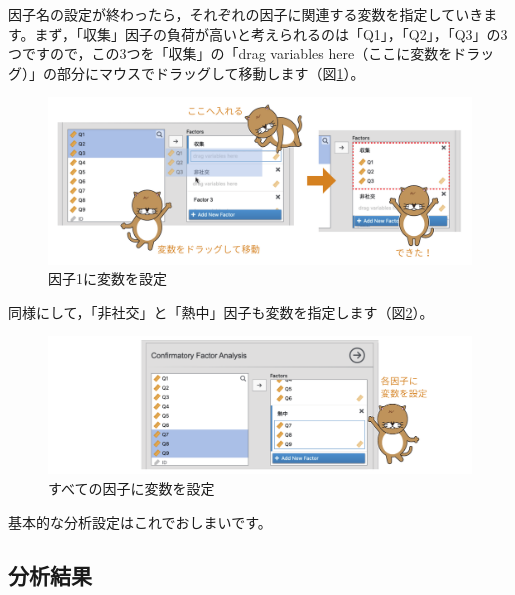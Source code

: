 \documentclass[
  12pt,
  a5jpaper,
  lualatex, ja=standard]{bxjsbook}
\begin{document}
因子名の設定が終わったら，それぞれの因子に関連する変数を指定していきます。まず，「収集」因子の負荷が高いと考えられるのは「Q1」，「Q2」，「Q3」の3つですので，この3つを「収集」の「drag variables here（ここに変数をドラッグ）」の部分にマウスでドラッグして移動します（図\ref{fig:factor-cfa-set-vars}）。

\begin{figure}[!ht]

{\centering \includegraphics[width=1\linewidth]{images/factor/cfa-set-vars} 

}

\caption{因子1に変数を設定}\label{fig:factor-cfa-set-vars}
\end{figure}

同様にして，「非社交」と「熱中」因子も変数を指定します（図\ref{fig:factor-cfa-set-vars2}）。

\begin{figure}[!ht]

{\centering \includegraphics[width=1\linewidth]{images/factor/cfa-set-vars2} 

}

\caption{すべての因子に変数を設定}\label{fig:factor-cfa-set-vars2}
\end{figure}

基本的な分析設定はこれでおしまいです。

\hypertarget{sub:factor-cfa-results}{%
\subsection{分析結果}\label{sub:factor-cfa-results}}
\end{document}
